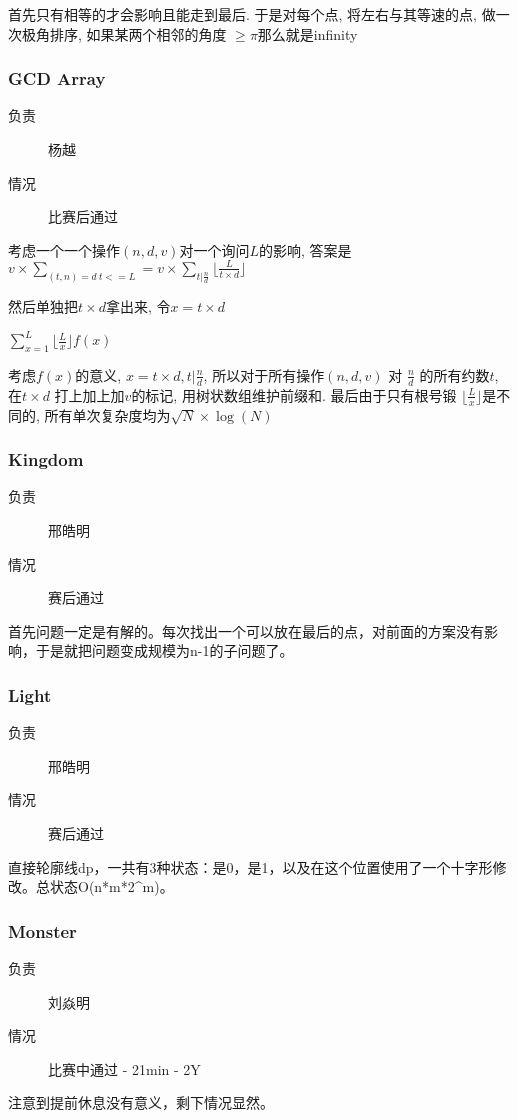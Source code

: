 \documentclass[a4paper, 11pt, nofonts, nocap, fancyhdr]{ctexart}
\newcommand{\problem}[1]{\subsubsection{#1}}
\begin{document}
首先只有相等的才会影响且能走到最后. 于是对每个点, 将左右与其等速的点, 做一次极角排序, 如果某两个相邻的角度 $\geq \pi$那么就是infinity

\problem{GCD Array}

\begin{description}
\item[负责] 杨越
\item[情况] 比赛后通过
\end{description}

考虑一个一个操作$(n, d, v)$对一个询问$L$的影响, 答案是$v\times \sum\limits_{(t,n)=d\ t<=L} = v\times \sum\limits_{t|\frac{n}{d}} \lfloor\frac{L}{t\times d}\rfloor$

然后单独把$t\times d$拿出来, 令$x = t\times d$

$\sum\limits_{x=1}^{L} \lfloor \frac{L}{x} \rfloor f(x)$

考虑$f(x)$的意义, $x=t\times d, t | \frac{n}{d}$, 所以对于所有操作$(n, d, v)$ 对 $\frac{n}{d}$ 的所有约数$t$, 在$t\times d$ 打上加上加$v$的标记, 用树状数组维护前缀和. 最后由于只有根号锻 $\lfloor\frac{L}{x}\rfloor$是不同的, 所有单次复杂度均为$\sqrt{N}\times \log(N)$

\problem{Kingdom}

\begin{description}
\item[负责] 邢皓明
\item[情况] 赛后通过
\end{description}

首先问题一定是有解的。每次找出一个可以放在最后的点，对前面的方案没有影响，于是就把问题变成规模为n-1的子问题了。

\problem{Light}

\begin{description}
\item[负责] 邢皓明
\item[情况] 赛后通过
\end{description}

直接轮廓线dp，一共有3种状态：是0，是1，以及在这个位置使用了一个十字形修改。总状态O(n*m*2^m)。

\problem{Monster}

\begin{description}
\item[负责] 刘焱明
\item[情况] 比赛中通过 - 21min - 2Y
\end{description}

注意到提前休息没有意义，剩下情况显然。
\end{document}

